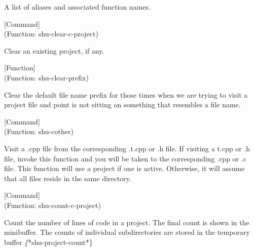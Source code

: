 A list of aliases and associated function names.



\vspace{1em}
\noindent
{}
\usebox{\funcname}
 \hfill [Command]\\%
 (Function: shu-clear-c-project)

\begin{doc-string}
Clear an existing project, if any.
\end{doc-string}

\vspace{1em}
\noindent
{}
\usebox{\funcname}
 \hfill [Function]\\%
 (Function: shu-clear-prefix)

\begin{doc-string}
Clear the default file name prefix for those times when we are trying to visit
a project file and point is not sitting on something that resembles a file name.
\end{doc-string}

\vspace{1em}
\noindent
{}
\usebox{\funcname}
 \hfill [Command]\\%
 (Function: shu-cother)

\begin{doc-string}
Visit a .cpp file from the corresponding .t.cpp or .h file.  If visiting a
t.cpp or .h file, invoke this function and you will be taken to the
corresponding .cpp or .c file.  This function will use a project if one is
active.  Otherwise, it will assume that all files reside in the same directory.
\end{doc-string}

\vspace{1em}
\noindent
{}
\usebox{\funcname}
 \hfill [Command]\\%
 (Function: shu-count-c-project)

\begin{doc-string}
Count the number of lines of code in a project.  The final count is shown in
the minibuffer.  The counts of individual subdirectories are stored in the
temporary buffer \emph\{*shu-project-count*\}
\end{doc-string}

